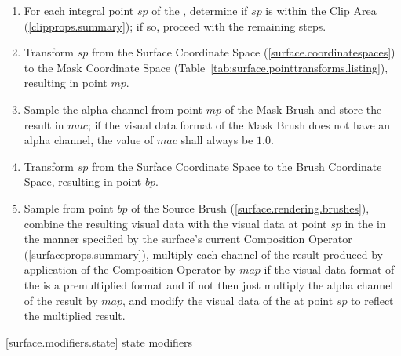\begin{enumerate}
\item For each integral point $sp$ of the \underlyingsurface, determine if $sp$ is within the Clip Area (\ref{clipprops.summary}); if so, proceed with the remaining steps.
\item Transform $sp$ from the Surface Coordinate Space (\ref{surface.coordinatespaces}) to the Mask Coordinate Space (Table~\ref{tab:surface.pointtransforms.listing}), resulting in point $mp$.
\item Sample the alpha channel from point $mp$ of the Mask Brush and store the result in $mac$; if the visual data format of the Mask Brush does not have an alpha channel, the value of $mac$ shall always be $1.0$.
\item Transform $sp$ from the Surface Coordinate Space to the Brush Coordinate Space, resulting in point $bp$.
\item Sample from point $bp$ of the Source Brush (\ref{surface.rendering.brushes}), combine the resulting visual data with the visual data at point $sp$ in the \underlyingsurface in the manner specified by the surface's current Composition Operator (\ref{surfaceprops.summary}), multiply each channel of the result produced by application of the Composition Operator by $map$ if the visual data format of the \underlyingsurface is a premultiplied format and if not then just multiply the alpha channel of the result by $map$, and modify the visual data of the \underlyingsurface at point $sp$ to reflect the multiplied result.
\end{enumerate}

 [surface.modifiers.state] { state modifiers}

